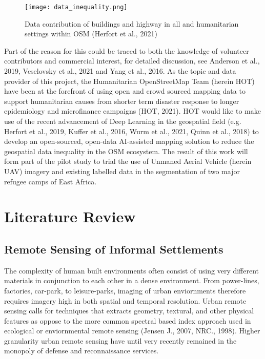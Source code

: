 \documentclass[11pt, a4paper, twoside]{report}
\begin{document}
\begin{figure}[H]
  \centering
  \texttt{[image: data\_inequality.png]}
  \caption{Data contribution of buildings and highway in all and humanitarian settings within OSM (Herfort et al., 2021)}
  \label{fig:data_inequality}
\end{figure}

Part of the reason for this could be traced to both the knowledge of volunteer contributors and commercial interest, for detailed discussion, see Anderson et al., 2019, Veselovsky et al., 2021 and Yang et al., 2016. As the topic and data provider of this project, the Humanitarian OpenStreetMap Team (herein HOT) have been at the forefront of using open and crowd sourced mapping data to support humanitarian causes from shorter term disaster response to longer epidemiology and microfinance campaigns (HOT, 2021). HOT would like to make use of the recent advancement of Deep Learning in the geospatial field (e.g. Herfort et al., 2019, Kuffer et al., 2016, Wurm et al., 2021, Quinn et al., 2018) to develop an open-sourced, open-data AI-assisted mapping solution to reduce the geospatial data inequality in the OSM ecosystem. The result of this work will form part of the pilot study to trial the use of Unmaned Aerial Vehicle (herein UAV) imagery and existing labelled data in the segmentation of two major refugee camps of East Africa.\\\par
\newpage

\chapter{Literature Review}\label{LitReview}

\section{Remote Sensing of Informal Settlements}\label{RSofInformalSettlement}

The complexity of human built environments often consist of using very different materials in conjunction to each other in a dense environment. From power-lines, factories, car-park, to leisure-parks, imaging of urban enviornments therefore requires imagery high in both spatial and temporal resolution. Urban remote sensing calls for techniques that extracts geometry, textural, and other physical features as oppose to the more common spectral based index approach used in ecological or enviornmental remote sensing (Jensen J., 2007, NRC., 1998). Higher granularity urban remote sensing have until very recently remained in the monopoly of defense and reconnaissance services.\\\par
\end{document}

